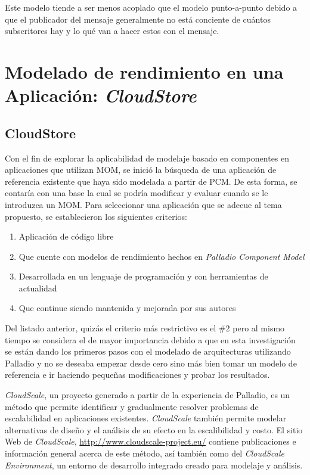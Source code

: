 \documentclass[article]{IEEEtran}
\begin{document}
Este modelo tiende a ser menos acoplado que el modelo punto-a-punto debido a que el publicador del mensaje generalmente no está conciente de cuántos subscritores hay y lo qué van a hacer estos con el mensaje. 

\section{Modelado de rendimiento en una Aplicación: \emph{CloudStore}} \label{sec:cloudstore}

\subsection{CloudStore} 
Con el fin de explorar la aplicabilidad de modelaje basado en componentes en aplicaciones que utilizan MOM, se inició la búsqueda de una aplicación de referencia existente que haya sido modelada a partir de PCM. De esta forma, se contaría con una base la cual se podría modificar y evaluar cuando se le introduzca un MOM. Para seleccionar una aplicación que se adecue al tema propuesto, se establecieron los siguientes criterios:
\begin{enumerate}
    \item Aplicación de código libre
    \item Que cuente con modelos de rendimiento hechos en \emph{Palladio Component Model}
    \item Desarrollada en un lenguaje de programación y con herramientas de actualidad
    \item Que continue siendo mantenida y mejorada por sus autores
\end{enumerate}
Del listado anterior, quizás el criterio más restrictivo es el \#2 pero al mismo tiempo se considera el de mayor importancia debido a que en esta investigación se están dando los primeros pasos con el modelado de arquitecturas utilizando Palladio y no se deseaba empezar desde cero sino más bien tomar un modelo de referencia e ir haciendo pequeñas modificaciones y probar los resultados.

\emph{CloudScale}\cite{cloudscale-2}, un proyecto generado a partir de la experiencia de Palladio, es un método que permite identificar y gradualmente resolver problemas de escalabilidad en aplicaciones existentes. \emph{CloudScale} también permite modelar alternativas de diseño y el análisis de su efecto en la escalibilidad y costo\cite{cloudscale}. El sitio Web de \emph{CloudScale}, \url{http://www.cloudscale-project.eu/} contiene publicaciones e información general acerca de este método, así también como del \emph{CloudScale Environment}, un entorno de desarrollo integrado creado para modelaje y análisis. 
\end{document}
